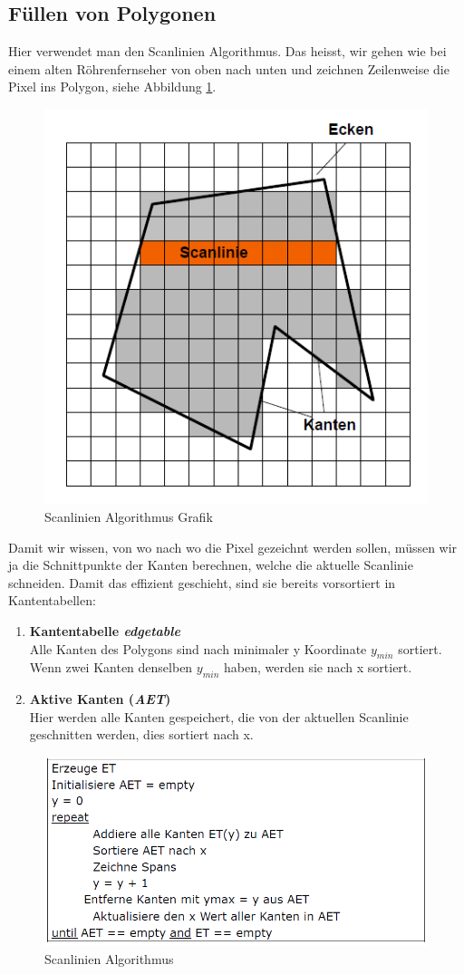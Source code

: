 \subsection{Füllen von Polygonen}
Hier verwendet man den Scanlinien Algorithmus. Das heisst, wir gehen wie bei einem alten Röhrenfernseher von oben nach unten und zeichnen Zeilenweise die Pixel ins Polygon, siehe Abbildung \ref{scanlinie}. 
\begin{figure}[!ht]
	\centering
	\includegraphics[width=0.4\linewidth]{fig/scanlinie}
	\caption{Scanlinien Algorithmus Grafik}
	\label{scanlinie}
\end{figure}
Damit wir wissen, von wo nach wo die Pixel gezeichnt werden sollen, müssen wir ja die Schnittpunkte der Kanten berechnen, welche die aktuelle Scanlinie schneiden. Damit das effizient geschieht, sind sie bereits vorsortiert in Kantentabellen:
\begin{enumerate}
	\item \textbf{Kantentabelle \textit{edgetable}}\\
	Alle Kanten des Polygons sind nach minimaler y Koordinate \(y_{min}\) sortiert. Wenn zwei Kanten denselben \(y_{min}\) haben, werden sie nach x sortiert.
	\item \textbf{Aktive Kanten (\textit{AET})}\\
	Hier werden alle Kanten gespeichert, die von der aktuellen Scanlinie geschnitten werden, dies sortiert nach x.
\end{enumerate}
\begin{figure}[!ht]
	\centering
	\includegraphics[width=0.5\linewidth]{fig/scanlinie_algo}
	\caption{Scanlinien Algorithmus}
	\label{scanlinie_algo}
\end{figure}
